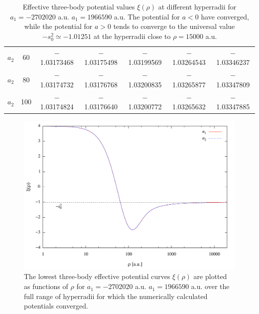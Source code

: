 \begin{table}[h!]
\begin{adjustwidth}{-0.1cm}{}
\begin{tabular}{||c c c c c c c||}
			$a_2$   & 60 & $-$1.03173468 & $-$1.03175498 & $-$1.03199569 & $-$1.03264543 & $-$1.03346237 \\
			$a_2$   & 80  & $-$1.03174732 & $-$1.03176768 & $-$1.03200835 & $-$1.03265877 & $-$1.03347809 \\
			$a_2$   & 100 & $-$1.03174824 & $-$1.03176640 & $-$1.03200772 & $-$1.03265632 & $-$1.03347885 \\ [0.7ex] 
			\hline
		\end{tabular}
	\end{adjustwidth}
	\caption{Effective three-body potential values $\xi(\rho)$ at different hyperradii for $a_1 = -2702020$ a.u. $a_1 = 1966590$ a.u. The potential for $a<0$ have converged, while the potential for $a>0$ tends to converge to the universal value $-s_0^2 \simeq -1.01251$ at the hyperradii close to $\rho=15000$ a.u.}
	\label{table:Res_2}
\end{table} 

\begin{figure}
	\includegraphics[width=\linewidth]{infty.pdf}
	\caption{The lowest three-body effective potential curves $\xi(\rho)$ are plotted as functions of $\rho$ for $a_1 = -2702020$ a.u. $a_1 = 1966590$ a.u. over the full range of hyperradii for which the numerically calculated potentials converged.}
	\label{fig:infty}
\end{figure}

